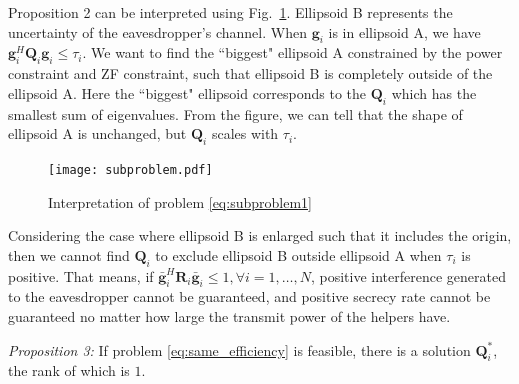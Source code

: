 \documentclass[journal]{IEEEtran}
\begin{document}
Proposition 2 can be interpreted using Fig.~\ref{fig:interpretation of subproblems}. Ellipsoid B represents the uncertainty of the eavesdropper's channel. When $\mathbf{g}_i$ is in ellipsoid A, we have $\mathbf{g}_i^H\mathbf{Q}_i\mathbf{g}_i \leq  \tau_{i}$. We want to find the ``biggest" ellipsoid A constrained by the power constraint and ZF constraint, such that ellipsoid B is completely outside of the ellipsoid A. Here the ``biggest" ellipsoid corresponds to the $\mathbf{Q}_i$ which has the smallest sum of eigenvalues.  From the figure, we can tell that the shape of ellipsoid A is unchanged, but $\mathbf{Q}_i$ scales with $\tau_i$.
\begin{figure}[ht]
	\centering
	\texttt{[image: subproblem.pdf]} %
	\caption{Interpretation of problem \eqref{eq:subproblem1}}
	\label{fig:interpretation of subproblems}
\end{figure}
Considering the case where  ellipsoid B is enlarged such that it includes the origin, then we cannot find $\mathbf{Q}_i$ to exclude ellipsoid B outside ellipsoid A when $\tau_i$ is positive. That means, if  $\bar{\mathbf{g}}_i^H\mathbf{R}_i\bar{\mathbf{g}}_i \leq 1, \forall i = 1, \ldots,N$, positive interference generated to the eavesdropper cannot be guaranteed, and positive secrecy rate cannot be guaranteed no matter how large the transmit power of the helpers have.   



\emph{Proposition 3:} If problem \eqref{eq:same_efficiency} is feasible, there is a solution $\mathbf{Q}_i^*$, the rank of which is $1$.
\end{document}
